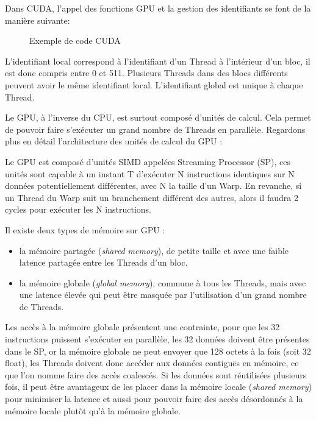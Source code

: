 \documentclass[a4paper,11pt]{report}
\begin{document}
  Dans CUDA, l'appel des fonctions GPU et la gestion des identifiants
  se font de la manière suivante:

  \begin{figure}[H]\begin{center}\caption{Exemple de code CUDA}\end{center}\end{figure}

  L'identifiant local correspond à l'identifiant d'un Thread à
  l'intérieur d'un bloc, il est donc compris entre 0 et
  511. Plusieurs Threads dans des blocs différents peuvent avoir le
  même identifiant local. L'identifiant global est unique à chaque Thread.

  
  Le GPU, à l'inverse du CPU, est surtout composé d'unités de calcul.
  Cela permet de pouvoir faire s'exécuter un grand nombre de Threads en
  parallèle. Regardons plus en détail l'architecture des unités de
  calcul du GPU :
  
  
  Le GPU est composé d'unités SIMD appelées Streaming Processor (SP), ces
  unités sont capable à un instant T d'exécuter N instructions
  identiques sur N données potentiellement différentes, avec N la
  taille d'un Warp. En revanche, si un Thread du Warp suit
  un branchement différent des autres, alors il faudra 2 cycles pour
  exécuter les N instructions.

  Il existe deux types de mémoire sur
  GPU :
  \begin{itemize}
  \item la mémoire partagée (\textit{shared memory}), de petite taille et avec une faible
    latence partagée entre les Threads d'un bloc.
  \item la mémoire globale (\textit{global memory}), commune à tous les Threads, mais avec une
    latence élevée qui peut être masquée par l'utilisation
    d'un grand nombre de Threads.
  \end{itemize}

  Les accès à
  la mémoire globale présentent une contrainte, pour que les 32
  instructions puissent s'exécuter en parallèle, les 32 données doivent
  être présentes dans le SP, or la mémoire globale ne peut envoyer que 128 octets à
  la fois (soit 32 float), les Threads doivent donc accéder aux données contiguës en
  mémoire, ce que l'on nomme faire des accès coalescés. Si les données sont
  réutilisées plusieurs fois, il peut être avantageux de les placer
  dans la mémoire locale (\textit{shared memory}) pour minimiser la latence et aussi pour pouvoir faire
  des accès désordonnés à la mémoire locale plutôt qu'à la mémoire globale.
\end{document}
